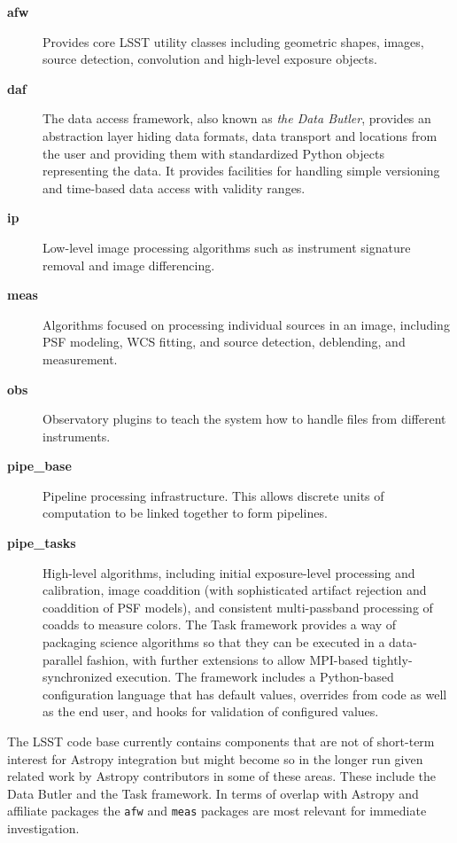 \documentclass[]{spie}  %
\begin{document}
\begin{description}
\item[\textbf{afw}] Provides core LSST utility classes including geometric shapes, images, source detection, convolution and high-level exposure objects.

\item[\textbf{daf}] The data access framework, also known as \emph{the Data Butler}, provides an abstraction layer hiding data formats, data transport and locations from the user and providing them with standardized Python objects representing the data.
It provides facilities for handling simple versioning and time-based data access with validity ranges.

\item[\textbf{ip}] Low-level image processing algorithms such as instrument signature removal and image differencing.

\item[\textbf{meas}] Algorithms focused on processing individual sources in an image, including PSF modeling, WCS fitting, and source detection, deblending, and measurement.

\item[\textbf{obs}] Observatory plugins to teach the system how to handle files from different instruments.

\item[\textbf{pipe\_base}] Pipeline processing infrastructure. This allows discrete units of computation to be linked together to form pipelines.

\item[\textbf{pipe\_tasks}] High-level algorithms, including initial exposure-level processing and calibration, image coaddition (with sophisticated artifact rejection and coaddition of PSF models), and consistent multi-passband processing of coadds to measure colors.
The Task framework provides a way of packaging science algorithms so that they can be executed in a data-parallel fashion, with further extensions to allow MPI-based tightly-synchronized execution.
The framework includes a Python-based configuration language that has default values, overrides from code as well as the end user, and hooks for validation of configured values.

\end{description}

The LSST code base currently contains components that are not of short-term interest for Astropy integration but might become so in the longer run given related work by Astropy contributors in some of these areas.
These include the Data Butler and the Task framework.
In terms of overlap with Astropy and affiliate packages the \texttt{afw} and \texttt{meas} packages are most relevant for immediate investigation.
\end{document}
